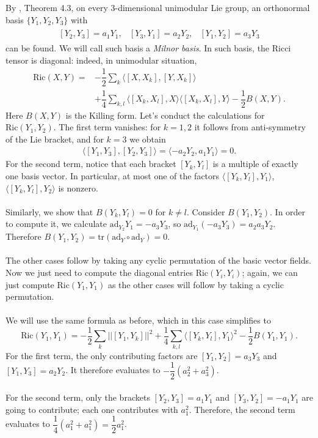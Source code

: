 \documentclass[12pt]{article}
\begin{document}
 By \cite{M}, Theorem 4.3,  on every 3-dimensional unimodular Lie group, an orthonormal basis $\{Y_1,Y_2,Y_3\}$ with \begin{align*}
    \begin{matrix}
        [Y_2,Y_3] = a_1Y_1, & [Y_3,Y_1] = a_2Y_2,& [Y_1,Y_2] = a_3Y_3
    \end{matrix}
\end{align*}
can be found. We will call such basis a \textit{Milnor basis}. In such basis, the Ricci tensor is diagonal: indeed, in unimodular situation,
\begin{align*}
    \text{Ric}(X,Y) = &-\dfrac{1}{2}\sum_{k}\langle [X,X_k],[Y,X_k] \rangle \\
    &+ \dfrac{1}{4}\sum_{k,l}\langle[X_k,X_l],X\rangle\langle[X_k,X_l],Y\rangle - \dfrac{1}{2}B(X,Y).
\end{align*}
Here $B(X,Y)$ is the Killing form. Let's conduct the calculations for $\text{Ric}(Y_1,Y_2)$. The first term vanishes: for $k=1,2$ it follows from anti-symmetry of the Lie bracket, and for $k=3$ we obtain \begin{align*}
    \langle [Y_1,Y_3],[Y_2,Y_3]\rangle = \langle -a_2Y_2,a_1Y_1\rangle = 0.
\end{align*} For the second term, notice that each bracket $[Y_k,Y_l]$ is a multiple of exactly one basis vector. In particular, at most one of the factors $\langle[Y_k,Y_l],Y_1\rangle$, $\langle[Y_k,Y_l],Y_2\rangle$ is nonzero. \\~\\
Similarly, we show that $B(Y_k,Y_l) = 0$ for $k \neq l$. Consider $B(Y_1,Y_2)$. In order to compute it, we calculate $\text{ad}_{Y_2}Y_1 = -a_3Y_3$, so  $\text{ad}_{Y_1}(-a_3Y_3) = a_2a_3Y_2$. Therefore $B(Y_1,Y_2) = \text{tr}(\text{ad}_Y \circ \text{ad}_Y) = 0$.\\~\\
The other cases follow by taking any cyclic permutation of the basic vector fields. Now we just need to compute the diagonal entries $\text{Ric}(Y_i,Y_i)$; again, we can just compute $\text{Ric}(Y_1,Y_1)$ as the other cases will follow by taking a cyclic permutation. \\~\\
We will use the same formula as before, which in this case simplifies to $$\text{Ric}(Y_1,Y_1) = -\dfrac{1}{2}\sum_{k}||[Y_1,Y_k]||^2 + \dfrac{1}{4}\sum_{k,l}\langle[Y_k,Y_l],Y_1\rangle^2 - \dfrac{1}{2}B(Y_1,Y_1).$$
For the first term, the only contributing factors are $[Y_1,Y_2] = a_3Y_3$ and $[Y_1,Y_3] = a_2Y_2$. It therefore evaluates to $-\dfrac{1}{2}\left(a_2^2 + a_3^2\right)$. \\~\\ For the second term, only the brackets $[Y_2,Y_3] = a_1Y_1$ and $[Y_3,Y_2] = -a_1Y_1$ are going to contribute; each one contributes with $a_1^2$. Therefore, the second term evaluates to $\dfrac{1}{4}\left(a_1^2+a_1^2\right) = \dfrac{1}{2}a_1^2$. \\~\\
\end{document}
